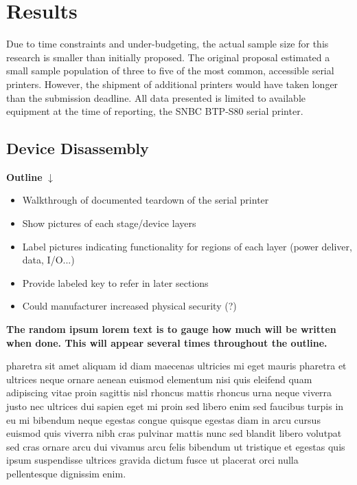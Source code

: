 \section*{Results}

Due to time constraints and under-budgeting, the actual sample size for this research is smaller than initially proposed. The original proposal estimated a small sample population of three to five of the most common, accessible serial printers. However, the shipment of additional printers would have taken longer than the submission deadline. All data presented is limited to available equipment at the time of reporting, the SNBC BTP-S80 serial printer.

\subsection{Device Disassembly} \label{devicedisassembly}

\textbf{Outline}
$\downarrow$

\begin{itemize}
    \item Walkthrough of documented teardown of the serial printer
    \item Show pictures of each stage/device layers
    \item Label pictures indicating functionality for regions of each layer (power deliver, data, I/O...)
    \item Provide labeled key to refer in later sections
    \item Could manufacturer increased physical security (?)
\end{itemize}

\textbf{The random ipsum lorem text is to gauge how much will be written when done. This will appear several times throughout the outline.}

pharetra sit amet aliquam id diam maecenas ultricies mi eget mauris pharetra et ultrices neque ornare aenean euismod elementum nisi quis eleifend quam adipiscing vitae proin sagittis nisl rhoncus mattis rhoncus urna neque viverra justo nec ultrices dui sapien eget mi proin sed libero enim sed faucibus turpis in eu mi bibendum neque egestas congue quisque egestas diam in arcu cursus euismod quis viverra nibh cras pulvinar mattis nunc sed blandit libero volutpat sed cras ornare arcu dui vivamus arcu felis bibendum ut tristique et egestas quis ipsum suspendisse ultrices gravida dictum fusce ut placerat orci nulla pellentesque dignissim enim.


